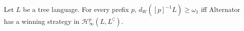 \begin{proposition}\label{prop:infinity} Let $L$ be a tree language. For every prefix $p$,
$d_W([p]^{-1}L) \geq \omega_1$ iff Alternator has a winning strategy in $\mathcal{H}^p_\infty(L, L^\complement)$. 

\end{proposition}
